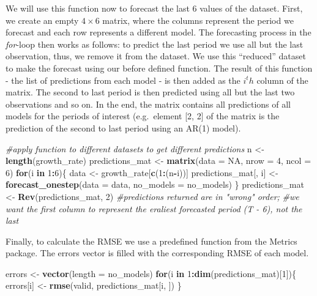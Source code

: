 \documentclass[
]{article}
\newenvironment{Shaded}{\begin{snugshade}}{\end{snugshade}}
\newcommand{\CommentTok}[1]{\textcolor[rgb]{0.56,0.35,0.01}{\textit{#1}}}
\newcommand{\ControlFlowTok}[1]{\textcolor[rgb]{0.13,0.29,0.53}{\textbf{#1}}}
\newcommand{\DataTypeTok}[1]{\textcolor[rgb]{0.13,0.29,0.53}{#1}}
\newcommand{\DecValTok}[1]{\textcolor[rgb]{0.00,0.00,0.81}{#1}}
\newcommand{\KeywordTok}[1]{\textcolor[rgb]{0.13,0.29,0.53}{\textbf{#1}}}
\newcommand{\NormalTok}[1]{#1}
\newcommand{\OperatorTok}[1]{\textcolor[rgb]{0.81,0.36,0.00}{\textbf{#1}}}
\newcommand{\OtherTok}[1]{\textcolor[rgb]{0.56,0.35,0.01}{#1}}
\newcommand{\StringTok}[1]{\textcolor[rgb]{0.31,0.60,0.02}{#1}}
\begin{document}
We will use this function now to forecast the last 6 values of the
dataset. First, we create an empty \(4\times 6\) matrix, where the
columns represent the period we forecast and each row represents a
different model. The forecasting process in the \emph{for}-loop then
works as follows: to predict the last period we use all but the last
observation, thus, we remove it from the dataset. We use this
``reduced'' dataset to make the forecast using our before defined
function. The result of this function - the list of predictions from
each model - is then added as the \(i^th\) column of the matrix. The
second to last period is then predicted using all but the last two
observations and so on. In the end, the matrix contains all predictions
of all models for the periods of interest (e.g.~element {[}2, 2{]} of
the matrix is the prediction of the second to last period using an AR(1)
model).

\begin{Shaded}
\begin{Highlighting}[]
\CommentTok{#apply function to different datasets to get different predictions }
\NormalTok{n <-}\StringTok{ }\KeywordTok{length}\NormalTok{(growth_rate)}
\NormalTok{predictions_mat <-}\StringTok{ }\KeywordTok{matrix}\NormalTok{(}\DataTypeTok{data =} \OtherTok{NA}\NormalTok{, }\DataTypeTok{nrow =} \DecValTok{4}\NormalTok{, }\DataTypeTok{ncol =} \DecValTok{6}\NormalTok{)}
\ControlFlowTok{for}\NormalTok{(i }\ControlFlowTok{in} \DecValTok{1}\OperatorTok{:}\DecValTok{6}\NormalTok{)\{}
\NormalTok{  data <-}\StringTok{ }\NormalTok{growth_rate[}\KeywordTok{c}\NormalTok{(}\DecValTok{1}\OperatorTok{:}\NormalTok{(n}\OperatorTok{-}\NormalTok{i))]}
\NormalTok{  predictions_mat[, i] <-}\StringTok{ }\KeywordTok{forecast_onestep}\NormalTok{(}\DataTypeTok{data =}\NormalTok{ data, }\DataTypeTok{no_models =}\NormalTok{ no_models)}
\NormalTok{\}}
\NormalTok{predictions_mat <-}\StringTok{ }\KeywordTok{Rev}\NormalTok{(predictions_mat, }\DecValTok{2}\NormalTok{) }\CommentTok{#predictions returned are in "wrong" order; }
\CommentTok{#we want the first column to represent the eraliest forecasted period (T - 6), not the last}
\end{Highlighting}
\end{Shaded}

Finally, to calculate the RMSE we use a predefined function from the
Metrics package. The errors vector is filled with the corresponding RMSE
of each model.

\begin{Shaded}
\begin{Highlighting}[]
\NormalTok{errors <-}\StringTok{ }\KeywordTok{vector}\NormalTok{(}\DataTypeTok{length =}\NormalTok{ no_models)}
\ControlFlowTok{for}\NormalTok{(i }\ControlFlowTok{in} \DecValTok{1}\OperatorTok{:}\KeywordTok{dim}\NormalTok{(predictions_mat)[}\DecValTok{1}\NormalTok{])\{}
\NormalTok{  errors[i] <-}\StringTok{ }\KeywordTok{rmse}\NormalTok{(valid, predictions_mat[i, ])}
\NormalTok{\}}
\end{Highlighting}
\end{Shaded}
\end{document}
